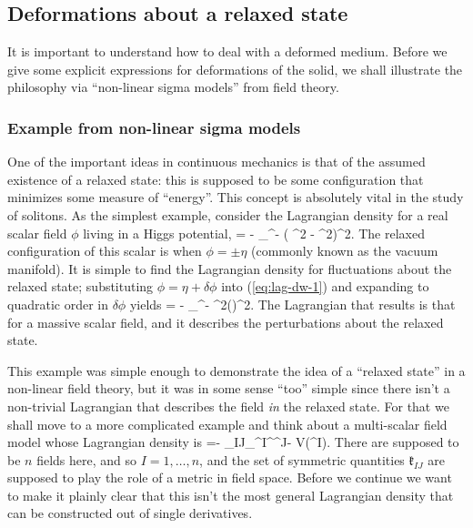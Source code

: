 \subsection{Deformations about a relaxed state}
It is   important to understand how to deal with a deformed medium. Before we give some explicit expressions for  deformations of the solid, we shall illustrate the philosophy via ``non-linear sigma models'' from field theory.
\subsubsection{Example from non-linear sigma models}
One of the important ideas in continuous mechanics is that of the assumed existence of a relaxed state: this is supposed to be some configuration that minimizes some measure of ``energy''. This concept is absolutely vital in the study of solitons. As the simplest example, consider the Lagrangian density for a real scalar field $\phi$ living in a Higgs potential,
\bea
\label{eq:lag-dw-1}
\ld = - \half \partial_{\mu}\phi\partial^{\mu}\phi - \left( \phi^2 - \eta^2\right)^2.
\eea
The relaxed configuration of this scalar is when $\phi = \pm \eta$ (commonly known as the vacuum manifold). It is simple to find the Lagrangian density for fluctuations about the relaxed state; substituting $\phi = \eta + \delta\phi$ into (\ref{eq:lag-dw-1}) and expanding to quadratic order in $\delta\phi$ yields
\bea
\ld = - \half \partial_{\mu}\delta\phi\partial^{\mu}\delta\phi - \half \lambda \eta^2(\delta\phi)^2.
\eea
The Lagrangian that results is that for a massive scalar field, and it describes the perturbations about the relaxed state. 

This example was simple enough to demonstrate the idea of a ``relaxed state'' in a non-linear field theory, but it was in some sense ``too'' simple since there isn't a non-trivial Lagrangian that describes the field \textit{in} the relaxed state. For that we shall move to a more complicated example and think about a multi-scalar field model whose Lagrangian density is
\bea
\label{eq:sec:lag-full}
\ld =- \half {}_{IJ}\partial_{\mu}\Phi^I\partial^{\mu}\Phi^J- V(\Phi^I).
\eea
There are supposed to be $n$ fields here, and so $I = 1, \ldots, n$, and the set of symmetric quantities $ \mathfrak{k}_{IJ}$ are supposed to play the role of a  metric in field space.
Before we continue we want to make it plainly clear that this isn't the most general Lagrangian density that can be constructed out of single derivatives. 

